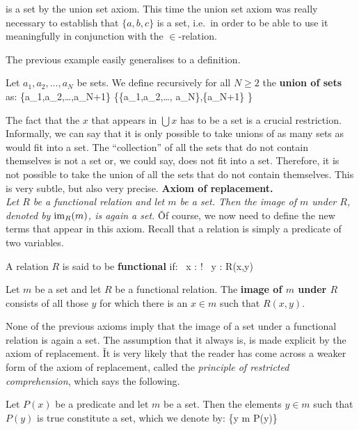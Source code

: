 is a set by the union set axiom. This time the union set axiom was really necessary to establish that $\{a,b,c\}$ is
a set, i.e.\ in order to be able to use it meaningfully in conjunction with the $\in$-relation.
\ee

The previous example easily generalises to a definition.

Let $a_1,a_2,\ldots,a_N$ be sets. We define recursively for all $N\geq 2$ the \textbf{union of sets} as:
\bse
\{a_1,a_2,\ldots,a_{N+1}\} \coloneqq \bigcup \left\{\{a_1,a_2,\ldots, a_{N}\},\{a_{N+1}\} \right\}
\ese
\ed

The fact that the $x$ that appears in $\bigcup x$ has to be a set is a crucial restriction. Informally, we can say
that it is only possible to take unions of as many sets as would fit into a set. The ``collection'' of all the sets
that do not contain themselves is not a set or, we could say, does not fit into a set. Therefore, it is not possible
to take the union of all the sets that do not contain themselves. This is very subtle, but also very precise. \v

\textbf{Axiom of replacement.} \\
\emph{Let $R$ be a functional relation and let $m$ be a set. Then the image of $m$ under $R$, denoted by $\mathrm{im}_R (m)$,
is again a set.} \v

Of course, we now need to define the new terms that appear in this axiom. Recall that a relation is simply a
predicate of two variables.

A relation $R$ is said to be \textbf{functional} if:
\bse
\forall \, x : \exists ! \, y : R(x,y)
\ese
\ed

Let $m$ be a set and let $R$ be a functional relation. The \textbf{image of $m$ under $R$} consists of all
those $y$ for which there is an $x\in m$ such that $R(x,y)$.
\ed

None of the previous axioms imply that the image of a set under a functional relation is again a set. The assumption
that it always is, is made explicit by the axiom of replacement. \v

It is very likely that the reader has come across a weaker form of the axiom of replacement, called the
\emph{principle of restricted comprehension}, which says the following.

Let $P(x)$ be a predicate and let $m$ be a set. Then the elements $y \in m$ such that $P(y)$ is true constitute a
set, which we denote by:
\bse
\{y \in m \mid P(y)\}
\ese
\et

